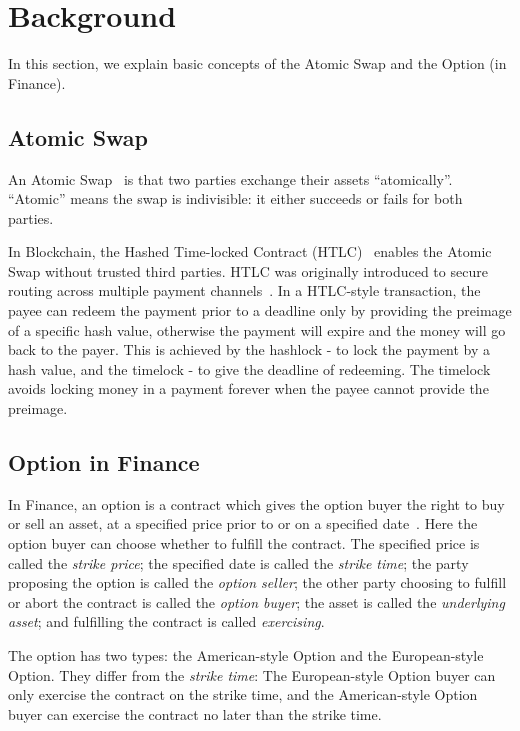 \section{Background}
\label{sec:background}

In this section, we explain basic concepts of the Atomic Swap and the Option (in Finance).

\subsection{Atomic Swap}

An Atomic Swap~\cite{nolan2013alt} is that two parties exchange their assets ``atomically''.
``Atomic'' means the swap is indivisible: it either succeeds or fails for both parties.

In Blockchain, the Hashed Time-locked Contract (HTLC)~\cite{poon2016bitcoin} enables the Atomic Swap without trusted third parties.
HTLC was originally introduced to secure routing across multiple payment channels~\cite{paychannel2018btcwiki}.
In a HTLC-style transaction, the payee can redeem the payment prior to a deadline only by providing the preimage of a specific hash value, otherwise the payment will expire and the money will go back to the payer.
This is achieved by the hashlock - to lock the payment by a hash value, and the timelock - to give the deadline of redeeming.
The timelock avoids locking money in a payment forever when the payee cannot provide the preimage.

\subsection{Option in Finance}
\label{subsec:background_option}

In Finance, an option is a contract which gives the option buyer the right to buy or sell an asset, at a specified price prior to or on a specified date~\cite{higham2004introduction}.
Here the option buyer can choose whether to fulfill the contract.
The specified price is called the \textit{strike price};
the specified date is called the \textit{strike time};
the party proposing the option is called the \textit{option seller};
the other party choosing to fulfill or abort the contract is called the \textit{option buyer};
the asset is called the \textit{underlying asset};
and fulfilling the contract is called \textit{exercising}.

The option has two types: the American-style Option and the European-style Option.
They differ from the \textit{strike time}:
The European-style Option buyer can only exercise the contract on the strike time,
and the American-style Option buyer can exercise the contract no later than the strike time.

